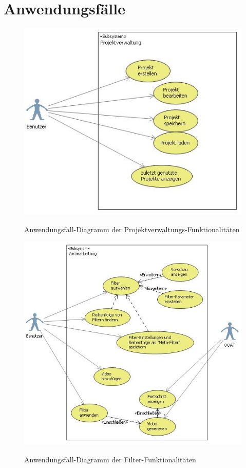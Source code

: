 \section{Anwendungsfälle}

\begin{figure}[h]
\includegraphics[scale=1]{bilder/anwendungsfalldiagramm_projektverwaltung.jpg}
\label{Anwendungsfalldiagramm_Projektverwaltung}
\caption{Anwendungsfall-Diagramm der Projektverwaltungs-Funktionalitäten}
\end{figure}

\begin{figure}[h]
\includegraphics[scale=1]{bilder/anwendungsfalldiagramm_filter.jpg}
\label{Anwendungsfalldiagramm_Filter}
\caption{Anwendungsfall-Diagramm der Filter-Funktionalitäten}
\end{figure}

